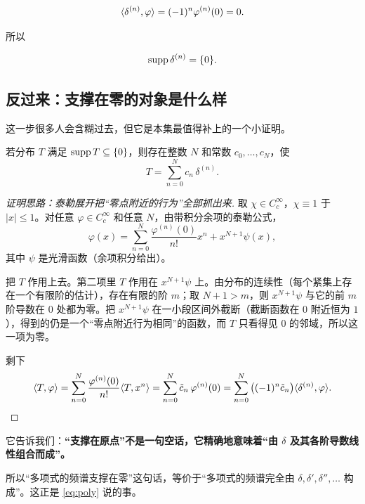 \begin{equation}
\langle \delta^{(n)},\varphi\rangle=(-1)^{n}\varphi^{(n)}(0)=0 .
\end{equation}

所以

\begin{equation}
\operatorname{supp}\delta^{(n)}=\{0\}.
\end{equation}

\subsection{反过来：支撑在零的对象是什么样}

这一步很多人会含糊过去，但它是本集最值得补上的一个小证明。

\begin{prop}\label{prop:support0}
若分布 $T$ 满足 $\operatorname{supp} T\subseteq\{0\}$，则存在整数 $N$ 和常数 $c_0,\dots,c_N$，使
\begin{equation}
T=\sum_{n=0}^{N}c_n\,\delta^{(n)} .
\end{equation}
\end{prop}

\begin{proof}[证明思路：泰勒展开把“零点附近的行为”全部抓出来]
取 $\chi\in C_c^{\infty}$，$\chi\equiv1$ 于 $|x|\le1$。对任意 $\varphi\in C_c^{\infty}$ 和任意 $N$，由带积分余项的泰勒公式，
\begin{equation}
\varphi(x)=\sum_{n=0}^{N}\frac{\varphi^{(n)}(0)}{n!}x^{n}+x^{N+1}\psi(x),
\end{equation}
其中 $\psi$ 是光滑函数（余项积分给出）。

把 $T$ 作用上去。第二项里 $T$ 作用在 $x^{N+1}\psi$ 上。由分布的连续性（每个紧集上存在一个有限阶的估计），存在有限的阶 $m$；取 $N+1>m$，则 $x^{N+1}\psi$ 与它的前 $m$ 阶导数在 $0$ 处都为零。把 $x^{N+1}\psi$ 在一小段区间外截断（截断函数在 $0$ 附近恒为 $1$），得到的仍是一个“零点附近行为相同”的函数，而 $T$ 只看得见 $0$ 的邻域，所以这一项为零。

剩下
\begin{equation}
\langle T,\varphi\rangle=\sum_{n=0}^{N}\frac{\varphi^{(n)}(0)}{n!}\langle T,x^{n}\rangle
=\sum_{n=0}^{N}\tilde c_n\,\varphi^{(n)}(0)
=\sum_{n=0}^{N}\big((-1)^{n}\tilde c_n\big)\langle \delta^{(n)},\varphi\rangle.
\end{equation}
\end{proof}

\begin{ideabox}[这个命题的真正用处]
它告诉我们：\textbf{“支撑在原点”不是一句空话，它精确地意味着“由 $\delta$ 及其各阶导数线性组合而成”。}

所以“多项式的频谱支撑在零”这句话，等价于“多项式的频谱完全由 $\delta,\delta',\delta'',\dots$ 构成”。这正是 \eqref{eq:poly} 说的事。
\end{ideabox}

